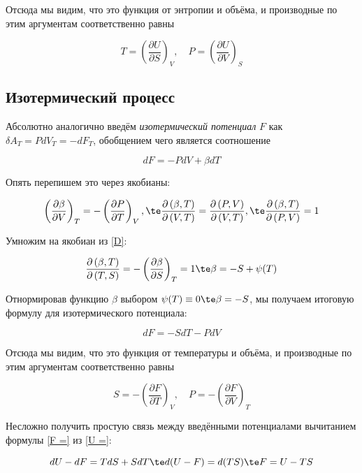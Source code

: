 \documentclass[12pt]{kiarticle}
\newcommand{\del}{\ensuremath{\delta}}
\newcommand{\spdd}[2]{\left( \frac{\partial #1}{\partial #2} \right)}
\newcommand{\Dd}[4]{\frac{\partial \left( #1, #2\right) }{\partial \left( #3, #4\right)}}
\begin{document}
Отсюда мы видим, что это функция от энтропии и объёма, и производные по этим аргументам соответственно равны 

\begin{equation}\label{}
T = \spdd{U}{S}_V, \quad P = \spdd{U}{V}_S
\end{equation}

\subsection{Изотермический процесс}

Абсолютно аналогично введём \textit{изотермический потенциал} $ F $ как $ \del A_T = P dV_T = - dF_T $, обобщением чего является соотношение

\begin{equation}\label{F}
dF = -PdV + \beta dT
\end{equation}

Опять перепишем это через якобианы: 

\begin{equation}\label{}
\spdd{\beta}{V}_T = - \spdd{P}{T}_V , \te \Dd{\beta}{T}{V}{T} = \Dd{P}{V}{V}{T} ,  \te \Dd{\beta}{T}{P}{V} = 1
\end{equation}

Умножим на якобиан из \eqref{D}:

\begin{equation}\label{}
\Dd{\beta}{T}{T}{S} = -\spdd{\beta}{S}_T = 1 \te \beta = -S + \psi(T)
\end{equation}

Отнормировав функцию $ \beta $ выбором $ \psi(T) \equiv 0 \te \beta=-S $, мы получаем итоговую формулу для изотермического потенциала:

\begin{equation}\label{F =}
dF = - SdT - PdV
\end{equation}

Отсюда мы видим, что это функция от температуры и объёма, и производные по этим аргументам соответственно равны 

\begin{equation}\label{}
S = -\spdd{F}{T}_V, \quad P = - \spdd{F}{V}_T
\end{equation}

Несложно получить простую связь между введёнными потенциалами вычитанием формулы \eqref{F =} из \eqref{U =}:

\begin{equation}\label{}
dU - dF = TdS + SdT \te d(U - F) = d(TS) \te F = U - TS
\end{equation}
\end{document}
